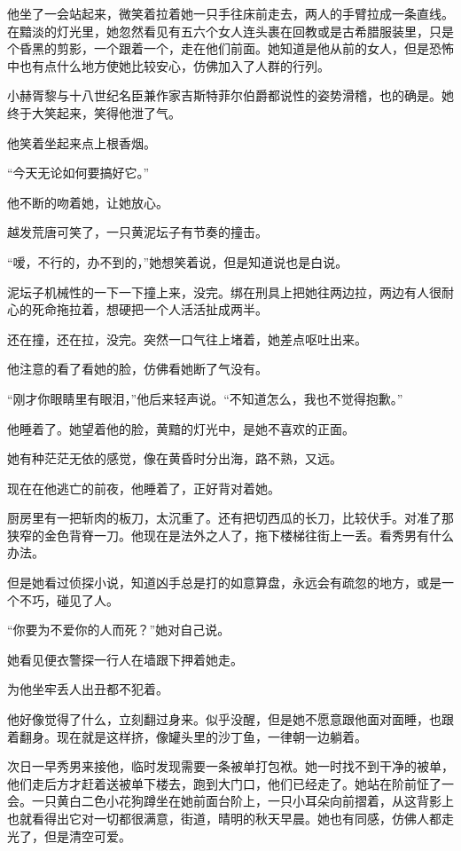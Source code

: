 \par 他坐了一会站起来，微笑着拉着她一只手往床前走去，两人的手臂拉成一条直线。在黯淡的灯光里，她忽然看见有五六个女人连头裹在回教或是古希腊服装里，只是个昏黑的剪影，一个跟着一个，走在他们前面。她知道是他从前的女人，但是恐怖中也有点什么地方使她比较安心，仿佛加入了人群的行列。
\par 小赫胥黎与十八世纪名臣兼作家吉斯特菲尔伯爵都说性的姿势滑稽，也的确是。她终于大笑起来，笑得他泄了气。
\par 他笑着坐起来点上根香烟。
\par “今天无论如何要搞好它。”
\par 他不断的吻着她，让她放心。
\par 越发荒唐可笑了，一只黄泥坛子有节奏的撞击。
\par “嗳，不行的，办不到的，”她想笑着说，但是知道说也是白说。
\par 泥坛子机械性的一下一下撞上来，没完。绑在刑具上把她往两边拉，两边有人很耐心的死命拖拉着，想硬把一个人活活扯成两半。
\par 还在撞，还在拉，没完。突然一口气往上堵着，她差点呕吐出来。
\par 他注意的看了看她的脸，仿佛看她断了气没有。
\par “刚才你眼睛里有眼泪，”他后来轻声说。“不知道怎么，我也不觉得抱歉。”
\par 他睡着了。她望着他的脸，黄黯的灯光中，是她不喜欢的正面。
\par 她有种茫茫无依的感觉，像在黄昏时分出海，路不熟，又远。
\par 现在在他逃亡的前夜，他睡着了，正好背对着她。
\par 厨房里有一把斩肉的板刀，太沉重了。还有把切西瓜的长刀，比较伏手。对准了那狭窄的金色背脊一刀。他现在是法外之人了，拖下楼梯往街上一丢。看秀男有什么办法。
\par 但是她看过侦探小说，知道凶手总是打的如意算盘，永远会有疏忽的地方，或是一个不巧，碰见了人。
\par “你要为不爱你的人而死？”她对自己说。
\par 她看见便衣警探一行人在墙跟下押着她走。
\par 为他坐牢丢人出丑都不犯着。
\par 他好像觉得了什么，立刻翻过身来。似乎没醒，但是她不愿意跟他面对面睡，也跟着翻身。现在就是这样挤，像罐头里的沙丁鱼，一律朝一边躺着。
\par 次日一早秀男来接他，临时发现需要一条被单打包袱。她一时找不到干净的被单，他们走后方才赶着送被单下楼去，跑到大门口，他们已经走了。她站在阶前怔了一会。一只黄白二色小花狗蹲坐在她前面台阶上，一只小耳朵向前摺着，从这背影上也就看得出它对一切都很满意，街道，晴明的秋天早晨。她也有同感，仿佛人都走光了，但是清空可爱。
